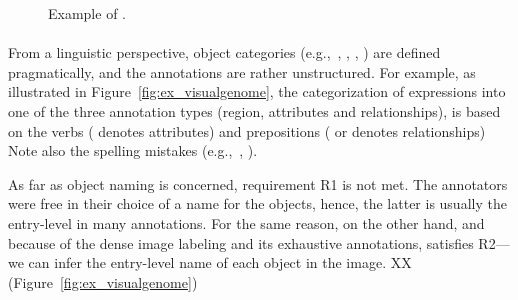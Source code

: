 {\begin{figure}[t]
\begin{center}
		\caption{Example of \flickr. \label{fig:ex_flickr}}
	\end{center}
\end{figure}



\paragraph{\vgenome}
From a linguistic perspective, object categories (e.g.,~, , , ) are defined pragmatically, and the annotations are rather unstructured. 
For example, as illustrated in Figure~\ref{fig:ex_visualgenome}, the categorization of expressions into one of the three annotation types (region, attributes and relationships), is based on the verbs ( denotes attributes) and prepositions ( or  denotes relationships) 
Note also the spelling mistakes (e.g.,~, ). 

As far as object naming is concerned, requirement R1 is not met.    
The annotators were free in their choice of a name for the objects, hence, the latter is usually the entry-level in many annotations. 
For the same reason, on the other hand, and because of the dense image labeling and its exhaustive annotations, \vgenome satisfies R2---we can infer the entry-level name of each object in the image. XX (Figure~\ref{fig:ex_visualgenome})\\


}
